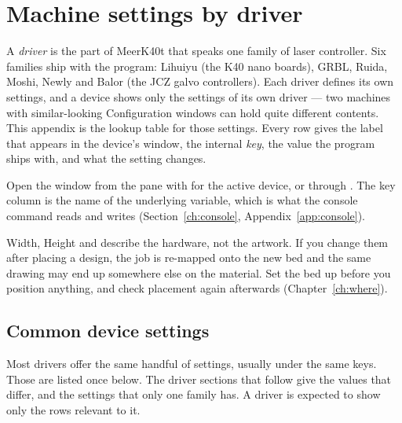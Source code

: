 \chapter{Machine settings by driver}
\label{app:drivers}

A \emph{driver} is the part of MeerK40t that speaks one family of laser
controller. Six families ship with the program: Lihuiyu (the K40 nano boards),
GRBL, Ruida, Moshi, Newly and Balor (the JCZ galvo controllers). Each driver
defines its own settings, and a device shows only the settings of its own
driver --- two machines with similar-looking Configuration windows can hold
quite different contents. This appendix is the lookup table for those settings.
Every row gives the label that appears in the device's  window, the
internal \emph{key}, the value the program ships with, and what the setting
changes.

Open the window from the  pane with  for the active
device, or through . The key column is the
name of the underlying variable, which is what the console  command
reads and writes (Section~\ref{ch:console}, Appendix~\ref{app:console}).

\begin{notebox}
Width, Height and  describe the hardware, not the
artwork. If you change them after placing a design, the job is re-mapped onto
the new bed and the same drawing may end up somewhere else on the material. Set
the bed up before you position anything, and check placement again afterwards
(Chapter~\ref{ch:where}).
\end{notebox}

\section*{Common device settings}

Most drivers offer the same handful of settings, usually under the same keys.
Those are listed once below. The driver sections that follow give the values
that differ, and the settings that only one family has. A driver is expected to
show only the rows relevant to it.

